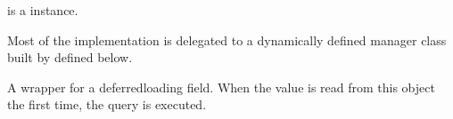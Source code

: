 \documentclass[letterpaper,10pt,english]{sphinxmanual}
\begin{document}
\begin{fulllineitems}
\begin{fulllineitems}
 is a  instance.

Most of the implementation is delegated to a dynamically defined manager
class built by  defined below.

\end{fulllineitems}


\begin{fulllineitems}
\label{\detokenize{forums:forums.models.Forum.title}}
A wrapper for a deferred\sphinxhyphen{}loading field. When the value is read from this
object the first time, the query is executed.

\end{fulllineitems}


\end{fulllineitems}

\end{document}
